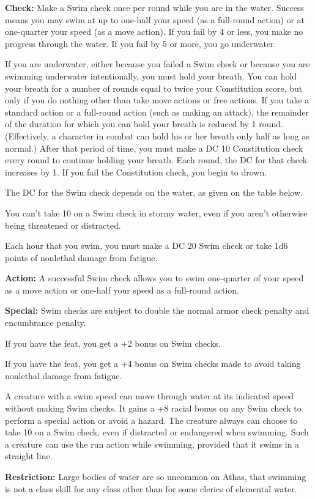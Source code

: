 \textbf{Check:} Make a Swim check once per round while you are in the water. Success means you may swim at up to one-half your speed (as a full-round action) or at one-quarter your speed (as a move action). If you fail by 4 or less, you make no progress through the water. If you fail by 5 or more, you go underwater.

If you are underwater, either because you failed a Swim check or because you are swimming underwater intentionally, you must hold your breath. You can hold your breath for a number of rounds equal to twice your Constitution score, but only if you do nothing other than take move actions or free actions. If you take a standard action or a full-round action (such as making an attack), the remainder of the duration for which you can hold your breath is reduced by 1 round. (Effectively, a character in combat can hold his or her breath only half as long as normal.) After that period of time, you must make a DC 10 Constitution check every round to continue holding your breath. Each round, the DC for that check increases by 1. If you fail the Constitution check, you begin to drown.

The DC for the Swim check depends on the water, as given on the table below.


You can’t take 10 on a Swim check in stormy water, even if you aren’t otherwise being threatened or distracted.

Each hour that you swim, you must make a DC 20 Swim check or take 1d6 points of nonlethal damage from fatigue.

\textbf{Action:} A successful Swim check allows you to swim one-quarter of your speed as a move action or one-half your speed as a full-round action.

\textbf{Special:} Swim checks are subject to double the normal armor check penalty and encumbrance penalty.

If you have the  feat, you get a +2 bonus on Swim checks.

If you have the  feat, you get a +4 bonus on Swim checks made to avoid taking nonlethal damage from fatigue.

A creature with a swim speed can move through water at its indicated speed without making Swim checks. It gains a +8 racial bonus on any Swim check to perform a special action or avoid a hazard. The creature always can choose to take 10 on a Swim check, even if distracted or endangered when swimming. Such a creature can use the run action while swimming, provided that it swims in a straight line.

\textbf{Restriction:} Large bodies of water are so uncommon on Athas, that swimming is not a class skill for any class other than for some clerics of elemental water.